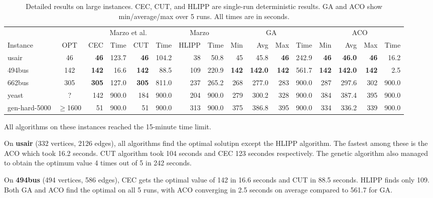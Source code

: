 \linespread{1.0}
\begin{table}[H]
\centering
\caption{Detailed results on large instances. CEC, CUT, and HLIPP are single-run deterministic results. GA and ACO show min/average/max over 5 runs. All times are in seconds.}
\label{tab:detailed}
\hspace*{-1.05cm}
\setlength{\tabcolsep}{3pt}
\footnotesize
\begin{tabular}{lc|rr|rr|rr|rrrr|rrrr}
\toprule
& & \multicolumn{4}{c|}{Marzo et al.~\cite{marzo2}} & \multicolumn{2}{c|}{Marzo~\cite{marzo}} & \multicolumn{4}{c|}{GA} & \multicolumn{4}{c}{ACO} \\
Instance & OPT & CEC & Time & CUT & Time & HLIPP & Time & Min & Avg & Max & Time & Min & Avg & Max & Time \\
\midrule
usair         & 46  & \textbf{46} & 123.7 & \textbf{46} & 104.2 & 38 & 50.8 & 45  & 45.8  & \textbf{46}  & 242.9  & \textbf{46}  & \textbf{46.0}  & \textbf{46}  & 16.2   \\
494bus        & 142 & \textbf{142} & 16.6 & \textbf{142} & 88.5 & 109 & 220.9 & \textbf{142} & \textbf{142.0} & \textbf{142} & 561.7  & \textbf{142} & \textbf{142.0} & \textbf{142} & 2.5    \\
662bus        & 305 & \textbf{305} & 127.0 & \textbf{305} & 811.0 & 237 & 265.2 & 268 & 277.0 & 283 & 900.0  & 287 & 297.6 & 302 & 900.0    \\
yeast         & ?   & 142 & 900.0 & 184 & 900.0 & 204 & 900.0 & 279 & 300.2 & 328 & 900.0  & 384 & 387.4 & 395 & 900.0  \\
gen-hard-5000 & $\geq$1600 & 51 & 900.0 & 51 & 900.0 & 313 & 900.0 & 375 & 386.8 & 395 & 900.0 & 334 & 336.2 & 339 & 900.0  \\
\bottomrule
\end{tabular}
\vspace{0.2cm}

\raggedright
All algorithms on these instances reached the 15-minute time limit.
\end{table}
\linespread{1.5}

On \textbf{usair} (332 vertices, 2126 edges), all algorithms find the optimal solutipn except the HLIPP algorithm. The fastest among these is the ACO which took 16.2 seconds. CUT algorithm took 104 seconds and CEC 123 secondes respectively. The genetic algorithm also managed to obtain the optimum value 4 times out of 5 in 242 seconds.

On \textbf{494bus} (494 vertices, 586 edges), CEC gets the optimal value of 142 in 16.6 seconds and CUT in 88.5 seconds. HLIPP finds only 109. Both GA and ACO find the optimal on all 5 runs, with ACO converging in 2.5 seconds on average compared to 561.7 for GA.

